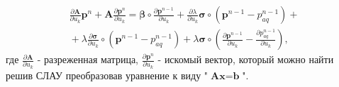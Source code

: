 \documentclass[14pt]{article}
\begin{document}
\begin{multline} \label{dFP_du}
\frac{\partial \boldsymbol{A}}{\partial u_k}\boldsymbol{p}^n + \boldsymbol{A}\frac{\partial \boldsymbol{p}^n}{\partial u_k} =
\boldsymbol{\beta}\circ\frac{\partial \boldsymbol{p}^{n-1}}{\partial u_k} + \frac{\partial \lambda}{\partial u_k}\boldsymbol{\sigma}\circ(\boldsymbol{p}^{n-1}-p_{aq}^{n-1})+ {} \\
{} + 
\lambda\frac{\partial \boldsymbol{\sigma}}{\partial u_k}\circ(\boldsymbol{p}^{n-1}-p_{aq}^{n-1})+
\lambda\boldsymbol{\sigma}\circ\left(\frac{\partial \boldsymbol{p}^{n-1}}{\partial u_k}-\frac{\partial p_{aq}^{n-1}}{\partial u_k}\right),
\end{multline}
где $ \frac{\partial \boldsymbol{A}}{\partial u_k} $ - разреженная матрица, $ \frac{\partial \boldsymbol{p}^n}{\partial u_k} $ - искомый вектор, который можно найти решив СЛАУ преобразовав уравнение к виду "$\textbf{A}\textbf{x}=\textbf{b}$".
\end{document}
